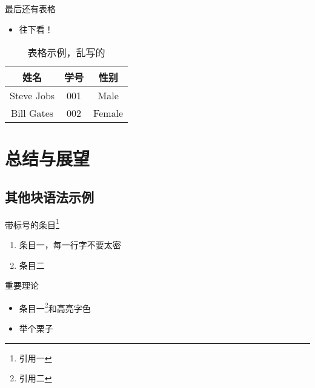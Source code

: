 \documentclass[
    fontset=fandol,
    xcolor=x11names %
]{ctexbeamer}
\begin{document}
\begin{frame}

    \begin{block}{最后还有表格}
        \begin{itemize}
            \item 往下看！
        \end{itemize}
    \end{block}

    \begin{table}
        \begin{tabular}{ccc}
            \hline
            姓名       & 学号 & 性别   \\
            \hline
            Steve Jobs & 001  & Male   \\
            Bill Gates & 002  & Female \\
            \hline
        \end{tabular}
        \caption{表格示例，乱写的}
        \label{fig:table-example}
    \end{table}

\end{frame}

\section{总结与展望}

\subsection{其他块语法示例}

\begin{frame}

    \begin{block}{带标号的条目\footnote{引用一}}
        \begin{enumerate}
            \item 条目一，每一行字不要太密
            \item 条目二
        \end{enumerate}
    \end{block}

    \begin{alertblock}{重要理论}
        \begin{itemize}
            \item 条目一\footnote{引用二}和\alert{高亮字色}
        \end{itemize}
    \end{alertblock}

    \begin{examples}
        \begin{itemize}
            \item 举个栗子
        \end{itemize}
    \end{examples}

\end{frame}
\end{document}
